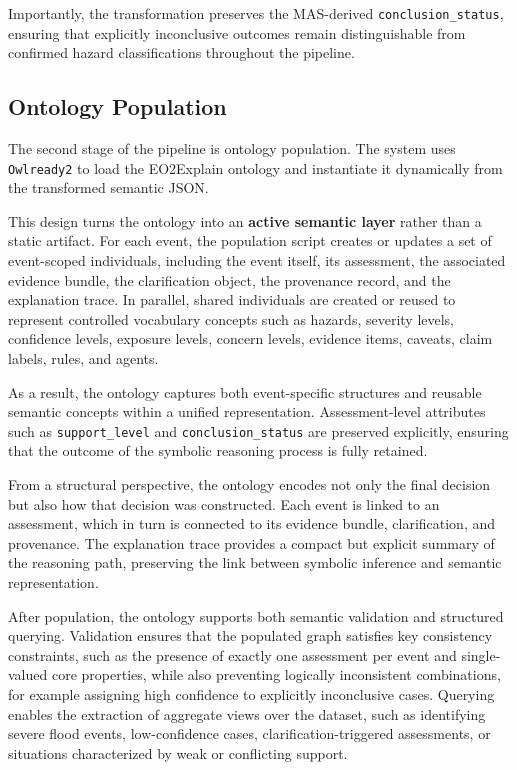 \documentclass[12pt]{article}
\let\oldtexttt\texttt
\renewcommand{\texttt}[1]{{\fontsize{10.5}{12}\selectfont\oldtexttt{#1}}}
\begin{document}
Importantly, the transformation preserves the MAS-derived \texttt{conclusion\_status}, ensuring that explicitly inconclusive outcomes remain distinguishable from confirmed hazard classifications throughout the pipeline.

\subsection{Ontology Population}

The second stage of the pipeline is ontology population. The system uses \texttt{Owlready2} to load the EO2Explain ontology and instantiate it dynamically from the transformed semantic JSON.

This design turns the ontology into an \textbf{active semantic layer} rather than a static artifact. For each event, the population script creates or updates a set of event-scoped individuals, including the event itself, its assessment, the associated evidence bundle, the clarification object, the provenance record, and the explanation trace. In parallel, shared individuals are created or reused to represent controlled vocabulary concepts such as hazards, severity levels, confidence levels, exposure levels, concern levels, evidence items, caveats, claim labels, rules, and agents.

As a result, the ontology captures both event-specific structures and reusable semantic concepts within a unified representation. Assessment-level attributes such as \texttt{support\_level} and \texttt{conclusion\_status} are preserved explicitly, ensuring that the outcome of the symbolic reasoning process is fully retained.

From a structural perspective, the ontology encodes not only the final decision but also how that decision was constructed. Each event is linked to an assessment, which in turn is connected to its evidence bundle, clarification, and provenance. The explanation trace provides a compact but explicit summary of the reasoning path, preserving the link between symbolic inference and semantic representation.

After population, the ontology supports both semantic validation and structured querying. Validation ensures that the populated graph satisfies key consistency constraints, such as the presence of exactly one assessment per event and single-valued core properties, while also preventing logically inconsistent combinations, for example assigning high confidence to explicitly inconclusive cases. Querying enables the extraction of aggregate views over the dataset, such as identifying severe flood events, low-confidence cases, clarification-triggered assessments, or situations characterized by weak or conflicting support.
\end{document}
